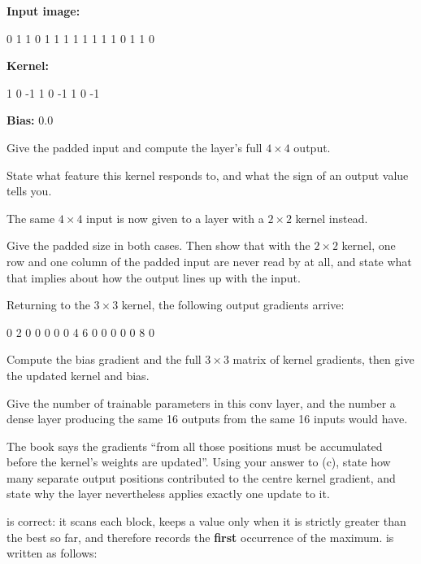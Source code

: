 \textbf{Input image:}

\begin{console}
0 1 1 0
1 1 1 1
1 1 1 1
0 1 1 0
\end{console}

\noindent\textbf{Kernel:}

\begin{console}
 1   0  -1
 1   0  -1
 1   0  -1
\end{console}

\noindent\textbf{Bias:} 0.0

 Give the padded input and compute the layer's full $4 \times 4$ output.

State what feature this kernel responds to, and what the sign of an output value tells you.

 The same $4 \times 4$ input is now given to a layer with a \textbf{$2 \times 2$} kernel
instead.

Give the padded size in both cases. Then show that with the $2 \times 2$ kernel, one row and one
column of the padded input are never read by  at all, and state what that
implies about how the output lines up with the input. 

 Returning to the $3 \times 3$ kernel, the following output gradients arrive:

\begin{console}
0  2  0  0
0  0  0  4
6  0  0  0
0  0  8  0
\end{console}

\noindent Compute the bias gradient and the full $3 \times 3$ matrix of kernel gradients, then give
the updated kernel and bias. 

 Give the number of trainable parameters in this conv layer, and the number a dense layer
producing the same 16 outputs from the same 16 inputs would have.

The book says the gradients ``from all those positions must be accumulated before the kernel's
weights are updated''. Using your answer to (c), state how many separate output positions
contributed to the centre kernel gradient, and state why the layer nevertheless applies exactly one
update to it. 

\label{exb:q:7}
 is correct: it scans each block, keeps a value only when it is
strictly greater than the best so far, and therefore records the \textbf{first} occurrence of the
maximum.  is written as follows:


